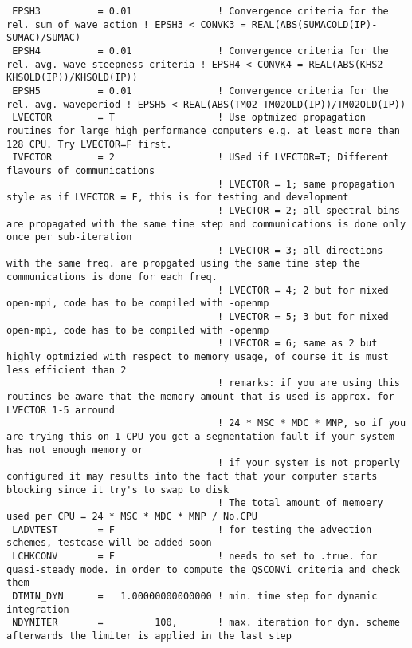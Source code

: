 \documentclass[12pt]{amsart}
\begin{document}
\begin{verbatim}
 EPSH3          = 0.01               ! Convergence criteria for the rel. sum of wave action ! EPSH3 < CONVK3 = REAL(ABS(SUMACOLD(IP)-SUMAC)/SUMAC)
 EPSH4          = 0.01               ! Convergence criteria for the rel. avg. wave steepness criteria ! EPSH4 < CONVK4 = REAL(ABS(KHS2-KHSOLD(IP))/KHSOLD(IP))
 EPSH5          = 0.01               ! Convergence criteria for the rel. avg. waveperiod ! EPSH5 < REAL(ABS(TM02-TM02OLD(IP))/TM02OLD(IP))
 LVECTOR        = T                  ! Use optmized propagation routines for large high performance computers e.g. at least more than 128 CPU. Try LVECTOR=F first.
 IVECTOR        = 2                  ! USed if LVECTOR=T; Different flavours of communications
                                     ! LVECTOR = 1; same propagation style as if LVECTOR = F, this is for testing and development
                                     ! LVECTOR = 2; all spectral bins are propagated with the same time step and communications is done only once per sub-iteration
                                     ! LVECTOR = 3; all directions with the same freq. are propgated using the same time step the communications is done for each freq.
                                     ! LVECTOR = 4; 2 but for mixed open-mpi, code has to be compiled with -openmp
                                     ! LVECTOR = 5; 3 but for mixed open-mpi, code has to be compiled with -openmp
                                     ! LVECTOR = 6; same as 2 but highly optmizied with respect to memory usage, of course it is must less efficient than 2
                                     ! remarks: if you are using this routines be aware that the memory amount that is used is approx. for LVECTOR 1-5 arround
                                     ! 24 * MSC * MDC * MNP, so if you are trying this on 1 CPU you get a segmentation fault if your system has not enough memory or
                                     ! if your system is not properly configured it may results into the fact that your computer starts blocking since it try's to swap to disk
                                     ! The total amount of memoery used per CPU = 24 * MSC * MDC * MNP / No.CPU
 LADVTEST       = F                  ! for testing the advection schemes, testcase will be added soon
 LCHKCONV       = F                  ! needs to set to .true. for quasi-steady mode. in order to compute the QSCONVi criteria and check them
 DTMIN_DYN      =   1.00000000000000 ! min. time step for dynamic integration 
 NDYNITER       =         100,       ! max. iteration for dyn. scheme afterwards the limiter is applied in the last step 

\end{verbatim}
\end{document}
